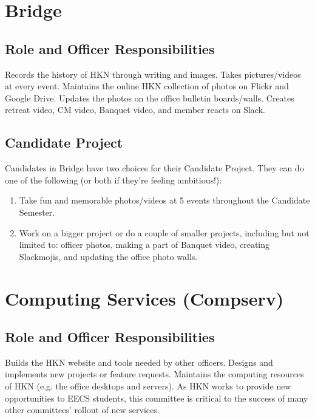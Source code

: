 \documentclass[11pt, article, oneside]{memoir}
\begin{document}
    \bigbreak

    \section{Bridge}
    \subsection{Role and Officer Responsibilities}
        Records the history of HKN through writing and images. Takes pictures/videos at every event. Maintains the online HKN collection of photos on Flickr and Google Drive. Updates the photos on the office bulletin boards/walls. Creates retreat video, CM video, Banquet video, and member reacts on Slack.

    \subsection{Candidate Project}
        Candidates in Bridge have two choices for their Candidate Project. They can do one of the following (or both if they're feeling ambitious!):
        \begin{enumerate}
            \item Take fun and memorable photos/videos at 5 events throughout the Candidate Semester.
            \item Work on a bigger project or do a couple of smaller projects, including but not limited to: officer photos, making a part of Banquet video, creating Slackmojis, and updating the office photo walls.
        \end{enumerate}

    \bigbreak


    \section{Computing Services (Compserv)}
    \subsection{Role and Officer Responsibilities}
        Builds the HKN website and tools needed by other officers. Designs and implements new projects or feature requests. Maintains the computing resources of HKN (e.g. the office desktops and servers). As HKN works to provide new opportunities to EECS students, this committee is critical to the success of many other committees' rollout of new services.
\end{document}
